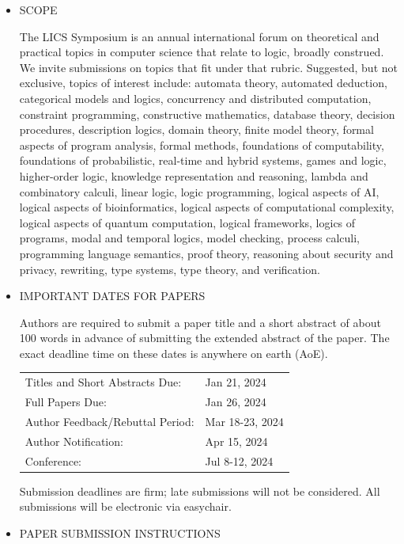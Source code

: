 \documentclass[prodmode,acmtecs]{acmsmall} %
\begin{document}
\begin{itemize}\item  SCOPE 
 
  The LICS Symposium is an annual international forum on theoretical and practical topics in computer science that relate to logic, broadly construed. We invite submissions on topics that fit under that rubric. Suggested, but not exclusive, topics of interest include: automata theory, automated deduction, categorical models and logics, concurrency and distributed computation, constraint programming, constructive mathematics, database theory, decision procedures, description logics, domain theory, finite model theory, formal aspects of program analysis, formal methods, foundations of computability, foundations of probabilistic, real-time and hybrid systems, games and logic, higher-order logic, knowledge representation and reasoning, lambda and combinatory calculi, linear logic, logic programming, logical aspects of AI, logical aspects of bioinformatics, logical aspects of computational complexity, logical aspects of quantum computation, logical frameworks, logics of programs, modal and temporal logics, model checking, process calculi, programming language semantics, proof theory, reasoning about security and privacy, rewriting, type systems, type theory, and verification. 
 
\item  IMPORTANT DATES FOR PAPERS 
 
  Authors are required to submit a paper title and a short abstract of about 100 words in advance of submitting the extended abstract of the paper. The exact deadline time on these dates is anywhere on earth (AoE). 
 
\begin{tabulary}{\linewidth}{LL}Titles and Short Abstracts Due:  & Jan 21, 2024 \\
Full Papers Due:  & Jan 26, 2024 \\
Author Feedback/Rebuttal Period:  & Mar 18-23, 2024 \\
Author Notification:  & Apr 15, 2024 \\
Conference:  & Jul 8-12, 2024 \\
\end{tabulary}
 
  Submission deadlines are firm; late submissions will not be considered. All submissions will be electronic via easychair. 
 
\item  PAPER SUBMISSION INSTRUCTIONS 
 

\end{itemize}
\end{document}
